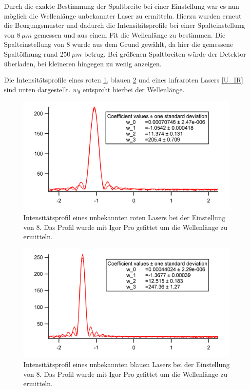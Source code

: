 Durch die exakte Bestimmung der Spaltbreite bei einer Einstellung war es nun möglich die Wellenlänge unbekannter Laser zu  ermitteln. Hierzu wurden erneut die Beugungsmuster und dadurch die Intensitätsprofile bei einer Spalteinstellung von $8~\mu m$ gemessen und aus einem Fit die Wellenlänge zu bestimmen. Die Spalteinstellung von $8$ wurde aus dem Grund gewählt, da hier die gemessene Spaltöffnung rund $250~\mu m$ betrug. Bei größenen Spaltbreiten würde der Detektor überladen, bei kleineren hingegen zu wenig anzeigen.

 Die Intensitätsprofile eines roten \ref{U_Rot}, blauen \ref{U_Blau} und eines infraroten Lasers \ref{U_IR} sind unten dargestellt. $w_0$ entsprcht hierbei der Wellenlänge. 

\begin{figure}[H]
	\centering	
	\begin{minipage}{1\textwidth}
		\includegraphics[width=\columnwidth]{180618/Graph_Rot.png}
	\end{minipage}
	\caption{Intensitätsprofil eines unbekannten roten Lasers bei der Einstellung von $8$. Das Profil wurde mit Igor Pro gefittet um die Wellenlänge zu ermitteln. }
	\label{U_Rot}
\end{figure}
\begin{figure}[H]
	\centering	
	\begin{minipage}{1\textwidth}
		\includegraphics[width=\columnwidth]{180618/Graph_Blau.png}
	\end{minipage}
	\caption{Intensitätsprofil eines unbekannten blauen Lasers bei der Einstellung von $8$. Das Profil wurde mit Igor Pro gefittet um die Wellenlänge zu ermitteln. }
	\label{U_Blau}
\end{figure}
